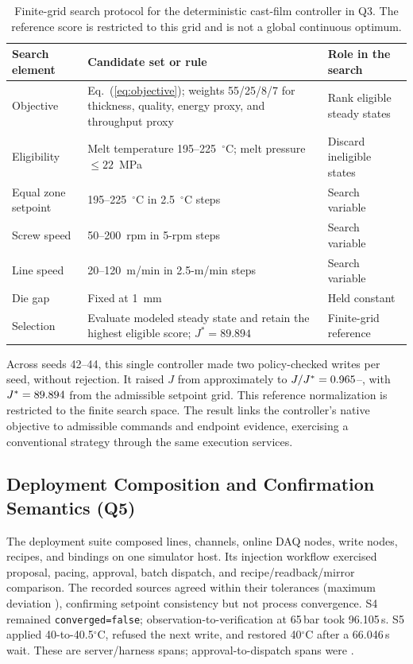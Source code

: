\begin{table}[!t]
\centering
\caption{Finite-grid search protocol for the deterministic cast-film
controller in Q3. The reference score is restricted to this grid and is not
a global continuous optimum.}
\label{tab:q3search}
\footnotesize
\setlength{\tabcolsep}{4pt}
\begin{tabularx}{\textwidth}{@{}p{2.4cm}Xp{3.0cm}@{}}
\toprule
Search element & Candidate set or rule & Role in the search \\
\midrule
Objective & Eq.~(\ref{eq:objective}); weights 55/25/8/7 for thickness,
quality, energy proxy, and throughput proxy & Rank eligible steady states \\
Eligibility & Melt temperature 195--225~$^{\circ}$C; melt pressure
$\leq 22$~MPa & Discard ineligible states \\
Equal zone setpoint & 195--225~$^{\circ}$C in 2.5~$^{\circ}$C steps & Search variable \\
Screw speed & 50--200~rpm in 5-rpm steps & Search variable \\
Line speed & 20--120~m/min in 2.5-m/min steps & Search variable \\
Die gap & Fixed at 1~mm & Held constant \\
Selection & Evaluate modeled steady state and retain the highest eligible
score; $J^{*}=89.894$ & Finite-grid reference \\
\bottomrule
\end{tabularx}
\end{table}

Across seeds 42--44, this single controller made two policy-checked writes per
seed, without rejection. It raised $J$ from approximately
\resJzero{} to $J/J^*=0.965$--\resControllerMax{}, with
$J^*=89.894$ from the admissible setpoint grid. This reference
normalization is restricted to the finite search space.
The result links the controller's native objective to admissible commands
and endpoint evidence, exercising a conventional strategy through the
same execution services.

\subsection{Deployment Composition and Confirmation Semantics (Q5)}
\label{sec:hardening}
The deployment suite composed \resLinesLive{} lines, \resChannelsLive{}
channels, \resDaqOnline{} online DAQ nodes, \resWriteNodesLive{} write nodes,
\resRecipesLive{} recipes, and \resBindingsLive{} bindings on one simulator
host. Its injection workflow exercised proposal, pacing, approval, batch
dispatch, and recipe/readback/mirror comparison. The recorded sources agreed
within their tolerances (maximum deviation \resConsistencyErr{}), confirming
setpoint consistency but not process convergence. S4 remained
\texttt{converged=false}; observation-to-verification at 65\,bar took
96.105\,s. S5 applied 40-to-40.5$^{\circ}$C, refused the next write, and
restored 40$^{\circ}$C after a 66.046\,s wait. These are server/harness spans; approval-to-dispatch spans
were \resHitlDispatchMs{}.

